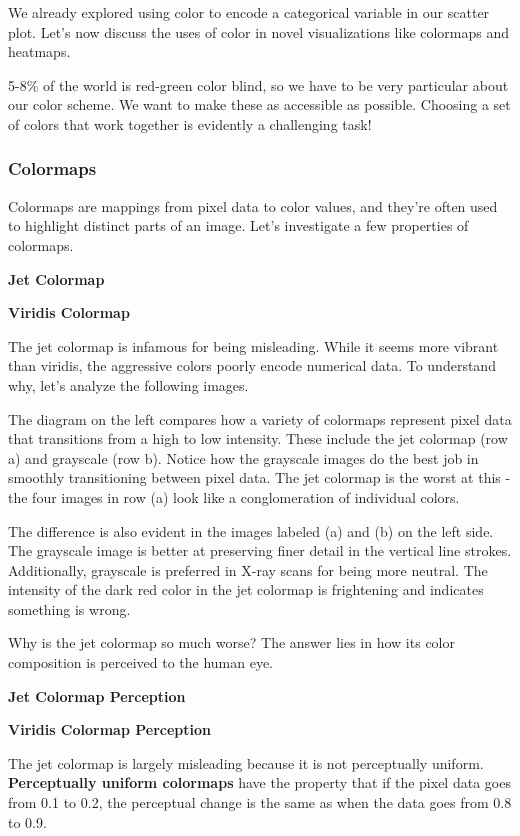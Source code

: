 \documentclass[
  letterpaper,
  DIV=11,
  numbers=noendperiod]{scrreprt}
\begin{document}
We already explored using color to encode a categorical variable in our
scatter plot. Let's now discuss the uses of color in novel
visualizations like colormaps and heatmaps.

5-8\% of the world is red-green color blind, so we have to be very
particular about our color scheme. We want to make these as accessible
as possible. Choosing a set of colors that work together is evidently a
challenging task!

\subsubsection{Colormaps}\label{colormaps}

Colormaps are mappings from pixel data to color values, and they're
often used to highlight distinct parts of an image. Let's investigate a
few properties of colormaps.

\textbf{Jet Colormap}

\textbf{Viridis Colormap}

The jet colormap is infamous for being misleading. While it seems more
vibrant than viridis, the aggressive colors poorly encode numerical
data. To understand why, let's analyze the following images.

The diagram on the left compares how a variety of colormaps represent
pixel data that transitions from a high to low intensity. These include
the jet colormap (row a) and grayscale (row b). Notice how the grayscale
images do the best job in smoothly transitioning between pixel data. The
jet colormap is the worst at this - the four images in row (a) look like
a conglomeration of individual colors.

The difference is also evident in the images labeled (a) and (b) on the
left side. The grayscale image is better at preserving finer detail in
the vertical line strokes. Additionally, grayscale is preferred in X-ray
scans for being more neutral. The intensity of the dark red color in the
jet colormap is frightening and indicates something is wrong.

Why is the jet colormap so much worse? The answer lies in how its color
composition is perceived to the human eye.

\textbf{Jet Colormap Perception}

\textbf{Viridis Colormap Perception}

The jet colormap is largely misleading because it is not perceptually
uniform. \textbf{Perceptually uniform colormaps} have the property that
if the pixel data goes from 0.1 to 0.2, the perceptual change is the
same as when the data goes from 0.8 to 0.9.
\end{document}
